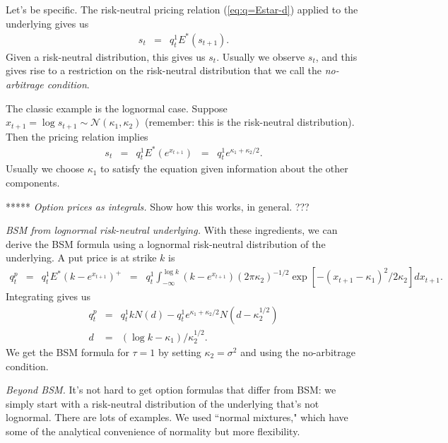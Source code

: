 \documentclass[11pt]{article}
\begin{document}
Let's be specific.
The risk-neutral pricing relation (\ref{eq:q=Estar-d})
applied to the underlying gives us
\begin{eqnarray*}
    s_t &=& q^1_t  E^* (s_{t+1}) .
\end{eqnarray*}
Given a risk-neutral distribution, this gives us $s_t$.
Usually we observe $s_t$, and this gives rise to a restriction
on the risk-neutral distribution that we call the
{\it no-arbitrage condition\/}.

The classic example is the lognormal case.
Suppose $x_{t+1} = \log s_{t+1} \sim \mathcal{N}(\kappa_1, \kappa_2)$
(remember:  this is the risk-neutral distribution).
Then the pricing relation implies
\begin{eqnarray*}
    s_t &=& q^1_t E^* (e^{x_{t+1}}) \;\;=\;\; q^1_t  e^{\kappa_1 + \kappa_2/2} .
\end{eqnarray*}
Usually we choose $\kappa_1$ to satisfy the equation given information
about the other components.

*****
{\it Option prices as integrals.\/}
Show how this works, in general.  ???

{\it BSM from lognormal risk-neutral underlying.\/}
With these ingredients, we can derive the BSM formula using
a lognormal risk-neutral distribution of the underlying.
A put price is at strike $k$ is
\begin{eqnarray*}
    q^p_t &=& q^1_t  E^* (k-e^{x_{t+1}})^+
          \;\;=\;\;  q^1_t  \int_{-\infty}^{\log k}
          (k-e^{x_{t+1}}) (2 \pi \kappa_2)^{-1/2}
          \exp[ - (x_{t+1} - \kappa_1)^2/2 \kappa_2] d x_{t+1} .
\end{eqnarray*}
Integrating gives us
\begin{eqnarray*}
    q^p_t &=& q^1_t k N(d) - q^1_t e^{\kappa_1 + \kappa_2/2} N(d-\kappa_2^{1/2}) \\
    d &=& (\log k - \kappa_1)/\kappa_2^{1/2} .
\end{eqnarray*}
We get the BSM formula for $\tau=1$ by setting $\kappa_2 = \sigma^2$
and using the no-arbitrage condition.


{\it Beyond BSM.\/}
It's not hard to get option formulas that differ from BSM:
we simply start with a risk-neutral distribution of the underlying
that's not lognormal.
There are lots of examples.
We used ``normal mixtures,"
which have some of the analytical convenience of normality
but more flexibility.



\end{document}
